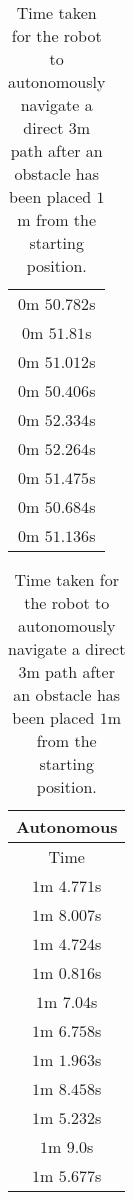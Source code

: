 \begin{appendices}
\begin{table}[!h]
\begin{tabular}{ c }
		$0$m $50.782$s \\

		$0$m $51.81$s \\

		$0$m $51.012$s \\

		$0$m $50.406$s \\

		$0$m $52.334$s \\

		$0$m $52.264$s \\

		$0$m $51.475$s \\

		$0$m $50.684$s \\

		\midrule
		$0$m $51.136$s \\
		\bottomrule
	\end{tabular}
	\hspace{2ex}
	\begin{tabular}{ c }
		\toprule
		\textbf{Autonomous} \\
		\midrule
		Time \\
		\midrule
		$1$m $4.771$s \\

		$1$m $8.007$s \\

		$1$m $4.724$s \\

		$1$m $0.816$s \\

		$1$m $7.04$s \\

		$1$m $6.758$s \\

		$1$m $1.963$s \\

		$1$m $8.458$s \\

		$1$m $5.232$s \\

		$1$m $9.0$s \\

		\midrule
		$1$m $5.677$s \\
		\bottomrule
	\end{tabular}
	\caption{Time taken for the robot to autonomously navigate a direct $3$m path after an obstacle has been placed $1$m from the starting position.}
	\label{tab:eval_nav_dp}
\end{table}


\end{appendices}
